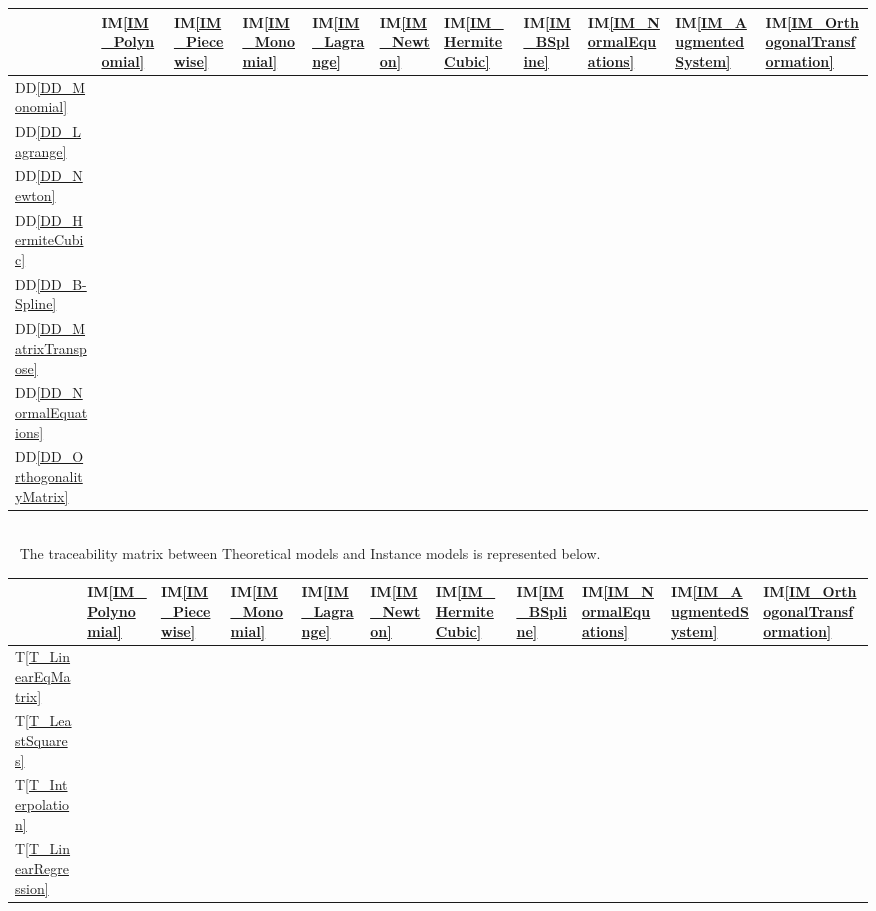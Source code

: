\documentclass[12pt]{article}
\newcommand{\ddref}[1]{DD\ref{#1}}
\newcommand{\tref}[1]{T\ref{#1}}
\newcommand{\iref}[1]{IM\ref{#1}}
\begin{document}
\begin{tabular}{|p{1.3cm}|p{1cm}|p{1cm}|p{1cm}|p{1cm}|p{1cm}|p{1cm}|p{1cm}|p{1cm}|p{1cm}|p{1cm}|}
	
	\hline
	&\iref{IM_Polynomial}  & \iref{IM_Piecewise} & \iref{IM_Monomial} & \iref{IM_Lagrange} & \iref{IM_Newton} & \iref{IM_HermiteCubic}  & \iref{IM_BSpline} & \iref{IM_NormalEquations} & \iref{IM_AugmentedSystem} & \iref{IM_OrthogonalTransformation}\\
	\hline
	\ddref{DD_Monomial} &  &   & \checkmark  &  &  &   &  &  &  & \\
	\hline
	\ddref{DD_Lagrange} &  &   &   &   \checkmark &   &    &  &  &  &  \\
	\hline
	\ddref{DD_Newton} &  & &  &  & \checkmark  &   & & & & \\
	\hline
	\ddref{DD_HermiteCubic} &  & &  &  &  & \checkmark   & & & & \\
	\hline
	\ddref{DD_B-Spline} &  & &  &  &  &   &\checkmark  & & & \\
	\hline
	\ddref{DD_MatrixTranspose} &  &   &   &   &   &    &  & \checkmark & \checkmark &  \\
	\hline
	\ddref{DD_NormalEquations} &  &  &   &   &   &  & & & \checkmark & \\
	\hline
	\ddref{DD_OrthogonalityMatrix} &  &   &   &   &   &  &  &  &  & \checkmark  \\
	\hline
\end{tabular}\\



~\newline
The traceability matrix between Theoretical models and Instance models is represented below.\\

\begin{tabular}{|p{1.3cm}|p{1cm}|p{1cm}|p{1cm}|p{1cm}|p{1cm}|p{1cm}|p{1cm}|p{1cm}|p{1cm}|p{1cm}|}
	
	\hline
	&\iref{IM_Polynomial}  & \iref{IM_Piecewise} & \iref{IM_Monomial} & \iref{IM_Lagrange} & \iref{IM_Newton} & \iref{IM_HermiteCubic}  & \iref{IM_BSpline} & \iref{IM_NormalEquations} & \iref{IM_AugmentedSystem} & \iref{IM_OrthogonalTransformation}\\
	\hline
	\tref{T_LinearEqMatrix} &  &   & \checkmark  & \checkmark & \checkmark  & \checkmark    &  & \checkmark & \checkmark & \checkmark \\
	\hline
	\tref{T_LeastSquares} &  &   &   &   &   &    &  & \checkmark & \checkmark & \checkmark \\
	\hline
	\tref{T_Interpolation} & \checkmark & \checkmark  & \checkmark  & \checkmark  & \checkmark  & \checkmark   & \checkmark & & & \\
	\hline
	\tref{T_LinearRegression} &  &   &   &   &   &  &  & \checkmark & \checkmark & \checkmark  \\
	\hline
\end{tabular}\\
\end{document}

